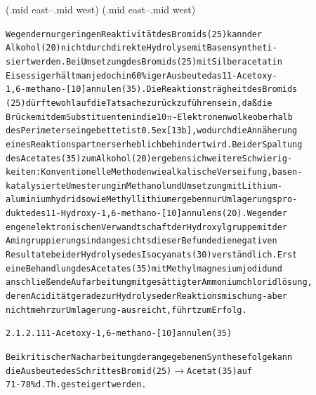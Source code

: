 \documentclass[a4paper,11pt]{article}
\begin{document}
\arrow(.mid east--.mid west)
\arrow(.mid east--.mid west)
\schemestop
\chemnameinit{}
\begin{alltt}

Wegen der nur geringen Reaktivität des Bromids (25) kann der
Alkohol (20) nicht durch direkte Hydrolyse mit Basen syntheti-
siert werden. Bei Umsetzung des Bromids (25) mit Silberacetat in
Eisessig erhält man jedoch in 60 \%iger Ausbeute das 11-Acetoxy-
1,6-methano-[10]annulen (35). Die Reaktionsträgheit des Bromids
(25) dürfte wohl auf die Tatsache zurückzuführen sein, daß die
Brücke mit dem Substituenten in die 10 \(\pi\)-Elektronenwolke oberhalb
des Perimeters eingebettet ist \raise0.5ex\hbox{[13b]}, wodurch die Annäherung
eines Reaktionspartners erheblich behindert wird. Bei der Spaltung
des Acetates (35) zum Alkohol (20) ergeben sich weitere Schwierig-
keiten: Konventionelle Methoden wie alkalische Verseifung, basen-
katalysierte Umesterung in Methanol und Umsetzung mit Lithium-
aluminiumhydrid sowie Methyllithium ergeben nur Umlagerungspro-
dukte des 11-Hydroxy-1,6-methano-[10]annulens (20). Wegen der
engen elektronischen Verwandtschaft der Hydroxylgruppe mit der
Amingruppierung sind angesichts dieser Befunde die negativen
Resultate bei der Hydrolyse des Isocyanats (30) verständlich. Erst
eine Behandlung des Acetates (35) mit Methylmagnesiumjodid und
anschließende Aufarbeitung mit gesättigter Ammoniumchloridlösung,
deren Acidität gerade zur Hydrolyse der Reaktionsmischung - aber
nicht mehr zur Umlagerung - ausreicht, führt zum Erfolg.

\newpage
{}


2.1.2.1 11-Acetoxy-1‚6-methano-[10]annulen (35)

Bei kritischer Nacharbeitung der angegebenen Synthesefolge kann
die Ausbeute des Schrittes Bromid (25) \(\longrightarrow\) Acetat (35) auf
71 - 78 \% d.Th. gesteigert werden.

\end{alltt}
\end{document}
